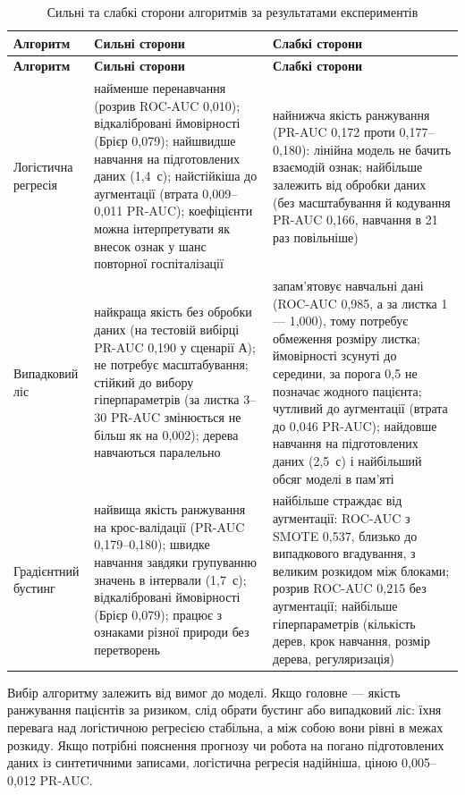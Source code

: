 \documentclass[14pt,a4paper]{extreport}
\begin{document}
{\small
\renewcommand{\arraystretch}{1.15}
\begin{longtable}{|p{2.8cm}|p{6.4cm}|p{6.4cm}|}
\caption{Сильні та слабкі сторони алгоритмів за результатами експериментів}
\label{tab:strengths} \\
\hline
\textbf{Алгоритм} & \textbf{Сильні сторони} & \textbf{Слабкі сторони} \\
\hline
\endfirsthead
\hline
\textbf{Алгоритм} & \textbf{Сильні сторони} & \textbf{Слабкі сторони} \\
\hline
\endhead
Логістична регресія & найменше перенавчання (розрив ROC-AUC 0,010); відкалібровані ймовірності (Брієр 0,079); найшвидше навчання на підготовлених даних (1,4~с); найстійкіша до аугментації (втрата 0,009--0,011 PR-AUC); коефіцієнти можна інтерпретувати як внесок ознак у шанс повторної госпіталізації & найнижча якість ранжування (PR-AUC 0,172 проти 0,177--0,180): лінійна модель не бачить взаємодій ознак; найбільше залежить від обробки даних (без масштабування й кодування PR-AUC 0,166, навчання в 21 раз повільніше) \\
\hline
Випадковий ліс & найкраща якість без обробки даних (на тестовій вибірці PR-AUC 0,190 у сценарії А); не потребує масштабування; стійкий до вибору гіперпараметрів (за листка 3--30 PR-AUC змінюється не більш як на 0,002); дерева навчаються паралельно & запам'ятовує навчальні дані (ROC-AUC 0,985, а за листка 1 --- 1,000), тому потребує обмеження розміру листка; ймовірності зсунуті до середини, за порога 0,5 не позначає жодного пацієнта; чутливий до аугментації (втрата до 0,046 PR-AUC); найдовше навчання на підготовлених даних (2,5~с) і найбільший обсяг моделі в пам'яті \\
\hline
Градієнтний бустинг & найвища якість ранжування на крос-валідації (PR-AUC 0,179--0,180); швидке навчання завдяки групуванню значень в інтервали (1,7~с); відкалібровані ймовірності (Брієр 0,079); працює з ознаками різної природи без перетворень & найбільше страждає від аугментації: ROC-AUC з SMOTE 0,537, близько до випадкового вгадування, з великим розкидом між блоками; розрив ROC-AUC 0,215 без аугментації; найбільше гіперпараметрів (кількість дерев, крок навчання, розмір дерева, регуляризація) \\
\hline
\end{longtable}
}

Вибір алгоритму залежить від вимог до моделі. Якщо головне --- якість ранжування пацієнтів за ризиком, слід обрати бустинг або випадковий ліс: їхня перевага над логістичною регресією стабільна, а між собою вони рівні в межах розкиду. Якщо потрібні пояснення прогнозу чи робота на погано підготовлених даних із синтетичними записами, логістична регресія надійніша, ціною 0,005--0,012 PR-AUC.
\end{document}
